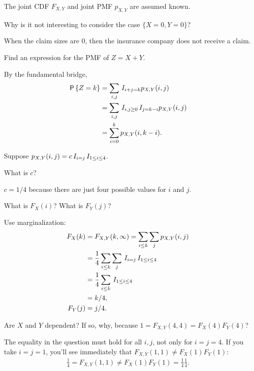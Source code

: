 \documentclass[lectures]{subfiles}
\begin{document}
The joint CDF $F_{X,Y}$ and joint PMF $p_{X,Y}$ are assumed known.

\begin{exercise}
Why is it not interesting to consider the case $\{X=0, Y=0\}$?
\begin{solution}
When the claim sizes are $0$, then the insurance company does not receive a claim.
\end{solution}
\end{exercise}


\begin{exercise}
Find an expression for the PMF of $Z=X+Y$.
\begin{solution}
By the fundamental bridge,
\begin{align}
\,\mathsf{P}\left\{Z=k\right\}
&= \sum_{i,j} \,I_{i+j=k} p_{X,Y}(i,j) \\
&= \sum_{i,j} \,I_{i, j \geq 0} \,I_{j=k-i} p_{X,Y}(i,j) \\
&= \sum_{i=0}^{k} p_{X,Y}(i,k-i).
\end{align}
\end{solution}
\end{exercise}

Suppose $p_{X,Y}(i,j) = c \,I_{i=j}\,I_{1\leq i \leq 4}$.


\begin{exercise}
What is $c$?
\begin{solution}
$c=1/4$ because there are just four possible values for $i$ and $j$.
\end{solution}
\end{exercise}

\begin{exercise}
What is $F_{X}(i)$?
What is $F_{Y}(j)$?
\begin{solution}
Use marginalization:
\begin{align}
F_X(k) &=  F_{X,Y}(k, \infty ) = \sum_{i\leq k} \sum_j p_{X,Y}(i,j) \\
 &= \frac{1}{4}\sum_{i\leq k} \sum_j \,I_{i=j}\,I_{1\leq i \leq 4}\\
 &= \frac{1}{4}\sum_{i\leq k} \,I_{1\leq i \leq 4} \\
&=k/4,\\
F_Y(j) &= j/4.
\end{align}
\end{solution}
\end{exercise}


\begin{exercise}
Are $X$ and $Y$ dependent?  If so, why, because $1=F_{X,Y}(4,4)= F_X(4)F_Y(4)$?
\begin{solution}
  The equality in the question must hold for all $i,j$, not only for $i=j=4$.
  If you take $i=j=1$, you'll see immediately that $F_{X,Y}(1,1)\neq F_X(1)F_Y(1)$:
  \begin{align}
    \label{eq:823}
    \frac{1}{4} = F_{X,Y}(1,1) \neq F_{X}(1) F_Y(1) = \frac{1}{4}\frac{1}{4}.
  \end{align}
\end{solution}
\end{exercise}
\end{document}
